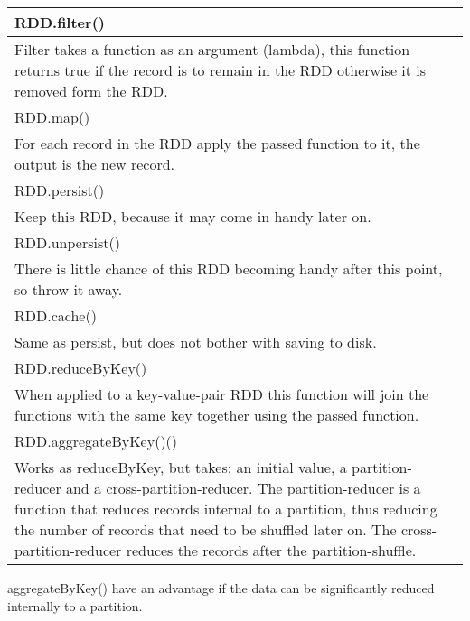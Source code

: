 \documentclass[abstract=on]{article}
\begin{document}
\begin{center}
\begin{tabularx}{0.75\textwidth}{ |X| }
\hline
\cellcolor[gray]{0.9}
RDD.filter() \\ \hline
Filter takes a function as an argument (lambda), this function returns true 
if the record is to remain in the RDD otherwise it is removed form the RDD. 
\\ \hline
\hline
\cellcolor[gray]{0.9}
RDD.map() \\ \hline
For each record in the RDD apply the passed function to it, the output is the 
 new record.
\\ \hline
\hline
\cellcolor[gray]{0.9}
RDD.persist() \\ \hline
Keep this RDD, because it may come in handy later on.
\\ \hline
\hline
\cellcolor[gray]{0.9}
RDD.unpersist() \\ \hline
There is little chance of this RDD becoming handy after this point, so throw it 
away.
\\ \hline
\hline
\cellcolor[gray]{0.9}
RDD.cache() \\ \hline
Same as persist, but does not bother with saving to disk.
\\ \hline
\hline
\cellcolor[gray]{0.9}
RDD.reduceByKey() \\ \hline
When applied to a key-value-pair RDD this function will join the functions with 
the same key together using the passed
function.
\\ \hline
\hline
\cellcolor[gray]{0.9}
RDD.aggregateByKey()() \\ \hline
Works as reduceByKey, but takes: an initial value, a partition-reducer and a 
cross-partition-reducer. The partition-reducer is a function that reduces 
records internal to a partition, thus reducing the number of records that need 
to be shuffled later on. The cross-partition-reducer reduces the records after 
the partition-shuffle.
\\ \hline
\end{tabularx}

\end{center}
aggregateByKey() have an advantage if the data can be significantly reduced internally to a partition.
\end{document}
